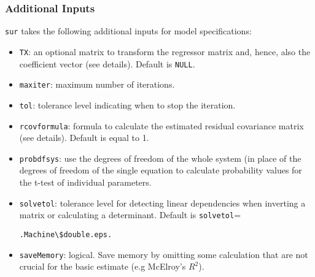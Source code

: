 \documentclass[12pt]{book}%
\begin{document}
\subsubsection{Additional Inputs}
\texttt{sur} takes the following additional inputs for model
specifications:
\begin{itemize}
\item \texttt{TX}: an optional matrix to transform the regressor
matrix and, hence, also the coefficient vector (see details). Default is \texttt{NULL}.
\item \texttt{maxiter}: maximum number of iterations.
\item \texttt{tol}: tolerance level indicating when to stop the iteration.
\item \texttt{rcovformula}: formula to calculate the estimated residual covariance
matrix (see details). Default is equal to 1.
\item \texttt{probdfsys}: use the degrees of freedom of the whole system
(in place of the degrees of freedom of the single equation to calculate probability
values for the t-test of individual parameters. 
\item \texttt{solvetol}: tolerance level for detecting linear dependencies when 
inverting a matrix or calculating a determinant. Default is \texttt {solvetol}= \begin{verbatim}.Machine\$double.eps.\end{verbatim}
\item \texttt{saveMemory}: logical. Save memory by omitting some calculation that are
not crucial for the basic estimate (e.g McElroy's $R^2$).
\end{itemize}
\end{document}
